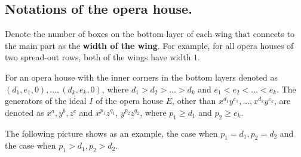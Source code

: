 \documentclass{amsart}[10pt]
\theoremstyle{plain}
\theoremstyle{definition}
\begin{document}
\subsection{Notations of the opera house.\\}
Denote the number of boxes on the bottom layer of each wing that connects to the main part as the \textbf{width of the wing}. For example, for all opera houses of two spread-out rows, both of the wings have width $1$. 

For an opera house with the inner corners in the bottom layers denoted as $(d_1, e_1, 0), ..., (d_k, e_k, 0)$, where $d_1 > d_2 > ... >d_k$ and $e_1 < e_2 < ... <e_k$. The generators of the ideal $I$ of the opera house $E$, other than $x^{d_1}y^{e_1}, ..., x^{d_k}y^{e_k}$,  are denoted as $x^a, y^b, z^c$ and $x^{p_1}z^{q_1}$, $y^{p_2}z^{q_2}$, where $p_1 \geq d_1$ and $p_2 \geq e_k$. 

The following picture shows as an example, the case when $p_1=d_1, p_2=d_2$ and the case when $p_1>d_1, p_2>d_2$.  
\end{document}
